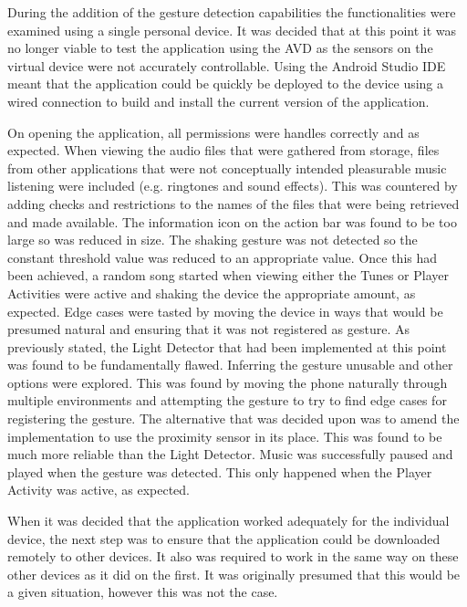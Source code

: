 \documentclass{l4proj}
\begin{document}
During the addition of the gesture detection capabilities the functionalities were examined using a single personal device. It was decided that at this point it was no longer viable to test the application using the AVD as the sensors on the virtual device were not accurately controllable. Using the Android Studio IDE meant that the application could be quickly be deployed to the device using a wired connection to build and install the current version of the application.

On opening the application, all permissions were handles correctly and as expected. When viewing the audio files that were gathered from storage, files from other applications that were not conceptually intended pleasurable music listening were included (e.g. ringtones and sound effects). This was countered by adding checks and restrictions to the names of the files that were being retrieved and made available. The information icon on the action bar was found to be too large so was reduced in size. The shaking gesture was not detected so the constant threshold value was reduced to an appropriate value. Once this had been achieved, a random song started when viewing either the Tunes or Player Activities were active and shaking the device the appropriate amount, as expected. Edge cases were tasted by moving the device in ways that would be presumed natural and ensuring that it was not registered as gesture. As previously stated, the Light Detector that had been implemented at this point was found to be fundamentally flawed. Inferring the gesture unusable and other options were explored. This was found by moving the phone naturally through multiple environments and attempting the gesture to try to find edge cases for registering the gesture. The alternative that was decided upon was to amend the implementation to use the proximity sensor in its place. This was found to be much more reliable than the Light Detector. Music was successfully paused and played when the gesture was detected. This only happened when the Player Activity was active, as expected.

When it was decided that the application worked adequately for the individual device, the next step was to ensure that the application could be downloaded remotely to other devices. It also was required to work in the same way on these other devices as it did on the first. It was originally presumed that this would be a given situation, however this was not the case.
\end{document}

